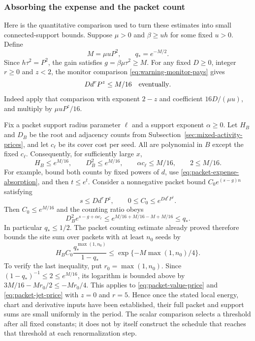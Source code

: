 \subsubsection{Absorbing the expense and the packet count}
Here is the quantitative comparison used to turn these estimates into
small connected-support bounds. Suppose $\mu>0$ and
$\beta\ge u h$ for some fixed $u>0$. Define
\[
 M=\mu u P^2,\qquad q_*=e^{-M/2}.
\]
Since $h\tau^2=P^2$, the gain satisfies $g=\beta\mu\tau^2\ge M$.
For any fixed $D\ge0$, integer $r\ge0$ and $z<2$, the monitor
comparison \eqref{eq:warning-monitor-pays} gives
\begin{equation}\label{eq:packet-expense-absorption}
 Dd^rP^z\le M/16
 \quad\hbox{eventually}.
\end{equation}
Indeed apply that comparison with exponent $2-z$ and coefficient
$16D/(\mu u)$, and multiply by $\mu uP^z/16$.

Fix a packet support radius parameter $\ell$ and a support exponent
$\alpha\ge0$. Let $H_B$ and $D_B$ be the root and adjacency counts
from Subsection~\ref{sec:mixed-activity-prices}, and let $c_\ell$ be its
cover cost per seed. All are polynomial in $B$ except the fixed
$c_\ell$. Consequently, for sufficiently large $x$,
\[
 H_B\le e^{M/16},\qquad D_B^2\le e^{M/16},\qquad
 \alpha c_\ell\le M/16,\qquad 2\le M/16.
\]
For example, bound both counts by fixed powers of $d$, use
\eqref{eq:packet-expense-absorption}, and then $t\le e^t$.
Consider a nonnegative packet bound
$C_0e^{(s-g)n}$ satisfying
\[
 s\le Dd^rP^z,\qquad 0\le C_0\le e^{Dd^rP^z}.
\]
Then $C_0\le e^{M/16}$ and the counting ratio obeys
\[
 D_B^2e^{s-g+\alpha c_\ell}
 \le e^{M/16+M/16-M+M/16}\le q_*.
\]
In particular $q_*\le1/2$. The packet counting estimate already proved
therefore bounds the site sum over packets with at least $n_0$ seeds by
\[
 H_BC_0\frac{q_*^{\max(1,n_0)}}{1-q_*}
 \le\exp\{-M\max(1,n_0)/4\}.
\]
To verify the last inequality, put $r_0=\max(1,n_0)$. Since
$(1-q_*)^{-1}\le2\le e^{M/16}$, its logarithm is bounded above by
$3M/16-Mr_0/2\le-Mr_0/4$.
This applies to \eqref{eq:packet-value-price} and
\eqref{eq:packet-jet-price} with $z=0$ and $r=5$. Hence once the
stated local energy, chart and derivative inputs have been established,
their full packet and support sums are small uniformly in the period.
The scalar comparison selects a threshold after all fixed constants;
it does not by itself construct the schedule that reaches that
threshold at each renormalization step.
